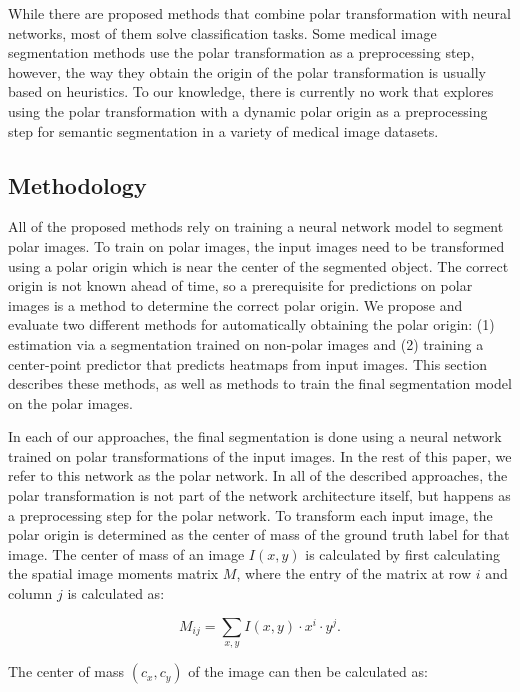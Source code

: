 While there are proposed methods that combine polar transformation with neural networks, most of them solve classification tasks. Some medical image segmentation methods use the polar transformation as a preprocessing step, however, the way they obtain the origin of the polar transformation is usually based on heuristics. To our knowledge, there is currently no work that explores using the polar transformation with a dynamic polar origin as a preprocessing step for semantic segmentation in a variety of medical image datasets.

  \subsection{Methodology}
  
All of the proposed methods rely on training a neural network model to segment polar images. To train on 
polar images, the input images need to be transformed using a polar origin which is near the center of 
the 
segmented object. The correct origin is not known ahead of time, so a prerequisite for predictions on polar
images is a method to determine the correct polar origin. We propose and 
evaluate two different methods for automatically obtaining the polar origin: (1)
estimation via a segmentation trained on non-polar images and (2) training a center-point predictor that predicts heatmaps from input images. 
This section describes these methods, as well as methods to train the 
final segmentation model on the polar images.
      
In each of our approaches, the final segmentation is done using a neural network trained on polar 
transformations of the input images. In the rest of this paper, we refer to this network as the polar 
network. In all of the described approaches, the polar transformation is not part of the network architecture itself, but happens as a preprocessing step for the polar network.
To transform each input image, the polar origin is determined as the center of mass of the 
ground truth label for that image. The center of mass of an image $I(x, y)$ is calculated by first 
calculating the spatial image moments matrix $M$, where the entry of the matrix at row $i$ and column $j$ is calculated as:

  \begin{equation}
    M_{ij}= \sum _{x,y} I(x,y) \cdot x^i \cdot y^j.
    \label{eq:moments}
  \end{equation}
  
The center of mass $(c_x, c_y)$ of the image can then be calculated as:

